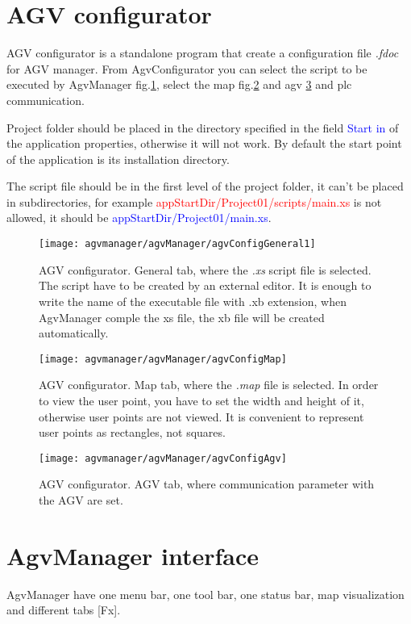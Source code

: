 \section{AGV configurator}

AGV configurator is a standalone program that create a configuration file \textit{.fdoc} for AGV manager. From AgvConfigurator you can select the script to be executed by AgvManager fig.\ref{fig:refConfigScript}, select the map fig.\ref{fig:refConfigMap} and agv \ref{fig:refConfigAgv} and plc communication.

Project folder should be placed in the directory specified in the field \textcolor{blue}{Start in} of the application properties, otherwise it will not work. By default the start point of the application is its installation directory.

The script file should be in the first level of the project folder, it can't be placed in subdirectories, for example \textcolor{red}{appStartDir/Project01/scripts/main.xs} is not allowed, it should be \textcolor{blue}{appStartDir/Project01/main.xs}.

\begin{figure}
	\centering\texttt{[image: agvmanager/agvManager/agvConfigGeneral1]}
	\caption{AGV configurator. General tab, where the \textit{.xs} script file is selected. The script have to be created by an external editor. It is enough to write the name of the executable file with .xb extension, when AgvManager comple the xs file, the xb file will be created automatically.}
	\label{fig:refConfigScript}
\end{figure}
\begin{figure}
	\centering\texttt{[image: agvmanager/agvManager/agvConfigMap]}
	\caption{AGV configurator. Map tab, where the \textit{.map} file is selected. In order to view the user point, you have to set the width and height of it, otherwise user points are not viewed. It is convenient to represent user points as rectangles, not squares.}
	\label{fig:refConfigMap}
\end{figure}
\begin{figure}
	\centering\texttt{[image: agvmanager/agvManager/agvConfigAgv]}
	\caption{AGV configurator. AGV tab, where communication parameter with the AGV are set.}
	\label{fig:refConfigAgv}
\end{figure}

\section{AgvManager interface}
AgvManager have one menu bar, one tool bar, one status bar, map visualization and different tabs [Fx].

